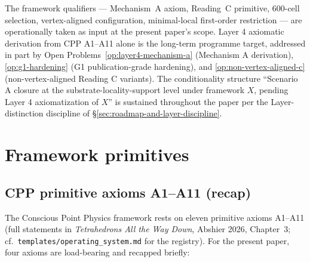 \documentclass[11pt,letterpaper]{article}
\begin{document}
The framework qualifiers --- Mechanism~A axiom, Reading~C primitive, 600-cell selection, vertex-aligned configuration, minimal-local first-order restriction --- are operationally taken as input at the present paper's scope. Layer 4 axiomatic derivation from CPP A1--A11 alone is the long-term programme target, addressed in part by Open Problems~\ref{op:layer4-mechanism-a} (Mechanism A derivation), \ref{op:g1-hardening} (G1 publication-grade hardening), and \ref{op:non-vertex-aligned-c} (non-vertex-aligned Reading C variants). The conditionality structure ``Scenario A closure at the substrate-locality-support level under framework $X$, pending Layer 4 axiomatization of $X$'' is sustained throughout the paper per the Layer-distinction discipline of \S\ref{sec:roadmap-and-layer-discipline}.

\section{Framework primitives}
\label{sec:framework-primitives}


\subsection{CPP primitive axioms A1--A11 (recap)}
\label{sec:cpp-axioms-recap}

The Conscious Point Physics framework rests on eleven primitive axioms A1--A11 (full statements in \emph{Tetrahedrons All the Way Down}, Abshier 2026, Chapter~3; cf.\ \texttt{templates/operating\_system.md} for the registry). For the present paper, four axioms are load-bearing and recapped briefly:
\end{document}
